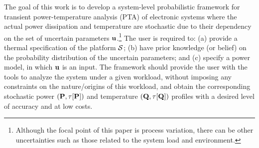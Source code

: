 The goal of this work is to develop a system-level probabilistic framework for transient power-temperature analysis (PTA) of electronic systems where the actual power dissipation and temperature are stochastic due to their dependency on the set of uncertain parameters $\mathbf{u}$.\footnote{Although the focal point of this paper is process variation, there can be other uncertainties such as those related to the system load and environment.}
The user is required to: (a) provide a thermal specification of the platform $\mathcal{S}$; (b) have prior knowledge (or belief) on the probability distribution of the uncertain parameters; and (c) specify a power model, in which $\mathbf{u}$ is an input.
The framework should provide the user with the tools to analyze the system under a given workload, without imposing any constraints on the nature/origins of this workload, and obtain the corresponding stochastic power $\profileP$ and temperature $\profileT$ profiles with a desired level of accuracy and at low costs.
